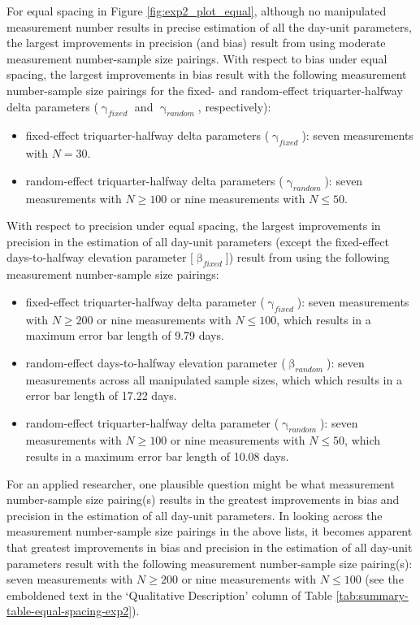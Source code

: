 \documentclass[
12pt, %
twoside,
english]{guelphthesis}
\theoremstyle{definition}
\theoremstyle{definition}
\theoremstyle{definition}
\theoremstyle{definition}
\theoremstyle{remark}
\begin{document}
For equal spacing in Figure \ref{fig:exp2_plot_equal}, although no manipulated measurement number results in precise estimation of all the day-unit parameters, the largest improvements in precision (and bias) result from using moderate measurement number-sample size pairings. With respect to bias under equal spacing, the largest improvements in bias result with the following measurement number-sample size pairings for the fixed- and random-effect triquarter-halfway delta parameters (\(\upgamma_{fixed}\) and \(\upgamma_{random}\), respectively):
\begin{itemize}
\tightlist
\item
  fixed-effect triquarter-halfway delta parameters (\(\upgamma_{fixed}\)): seven measurements with \(N = 30\).
\item
  random-effect triquarter-halfway delta parameters (\(\upgamma_{random}\)): seven measurements with \(N \ge 100\) or nine measurements with \(N \le 50\).
\end{itemize}
\noindent With respect to precision under equal spacing, the largest improvements in precision in the estimation of all day-unit parameters (except the fixed-effect days-to-halfway elevation parameter {[}\(\upbeta_{fixed}\){]}) result from using the following measurement number-sample size pairings:
\begin{itemize}
\tightlist
\item
  fixed-effect triquarter-halfway delta parameter (\(\upgamma_{fixed}\)): seven measurements with \(N \ge 200\) or nine measurements with \(N \le 100\), which results in a maximum error bar length of 9.79 days.
\item
  random-effect days-to-halfway elevation parameter (\(\upbeta_{random}\)): seven measurements across all manipulated sample sizes, which which results in a error bar length of 17.22 days.
\item
  random-effect triquarter-halfway delta parameter (\(\upgamma_{random}\)): seven measurements with \(N \ge 100\) or nine measurements with \(N \le 50\), which results in a maximum error bar length of 10.08 days.
\end{itemize}
For an applied researcher, one plausible question might be what measurement number-sample size pairing(s) results in the greatest improvements in bias and precision in the estimation of all day-unit parameters. In looking across the measurement number-sample size pairings in the above lists, it becomes apparent that greatest improvements in bias and precision in the estimation of all day-unit parameters result with the following measurement number-sample size pairing(s): seven measurements with \(N \ge 200\) or nine measurements with \(N \le 100\) (see the emboldened text in the `Qualitative Description' column of Table \ref{tab:summary-table-equal-spacing-exp2}).
\end{document}

